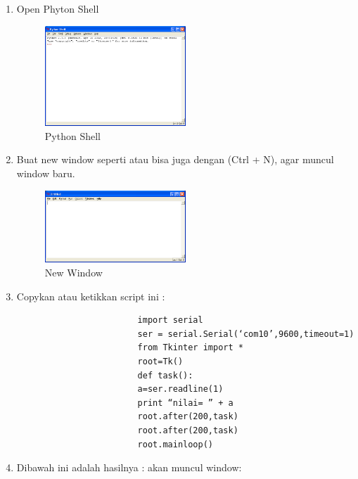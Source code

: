 		\begin{enumerate}
			\item Open Phyton Shell
			
				\begin{figure}[ht]
			\centerline{\includegraphics[width=0.5\textwidth]{figures/pyshell.png}}
			\caption{Python Shell}
			\label{pyshell}
			\end{figure}
			
			\item Buat new window seperti atau bisa juga dengan (Ctrl + N), agar muncul window baru.
				
				\begin{figure}[ht]
			\centerline{\includegraphics[width=0.5\textwidth]{figures/pyshellnew.png}}
			\caption{New Window}
			\label{pyshellnew}
			\end{figure}
			
			\item Copykan atau ketikkan script ini :
				\begin{verbatim}
					    import serial
						ser = serial.Serial(‘com10’,9600,timeout=1)
						from Tkinter import *
						root=Tk()
						def task():
						a=ser.readline(1)
						print “nilai= ” + a
						root.after(200,task)
						root.after(200,task)
						root.mainloop()
					\end{verbatim}
					
			\item Dibawah ini adalah hasilnya :
			akan muncul window:
			

\end{enumerate}
